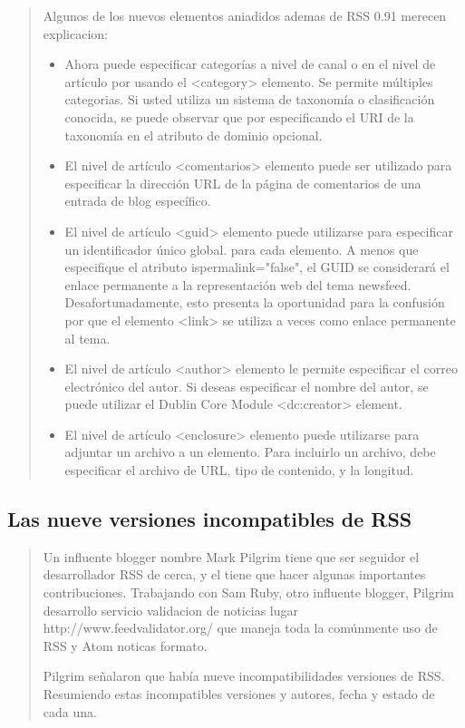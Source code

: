 \blockquote {

Algunos de los nuevos elementos aniadidos ademas de RSS 0.91 merecen explicacion:

\begin{itemize}

\item Ahora puede especificar categorías a nivel de canal o en el nivel de artículo por usando el <category>
 elemento. Se permite múltiples categorias. Si usted utiliza un sistema de taxonomía o clasificación 
 conocida, se puede observar que por especificando el URI de la taxonomía en el atributo de dominio opcional.

\item El nivel de artículo <comentarios> elemento puede ser utilizado para especificar la dirección URL de la
página de comentarios de una entrada de blog específico.

\item El nivel de artículo <guid> elemento puede utilizarse para especificar un identificador único global.
para cada elemento. A menos que especifique el atributo ispermalink="false", el GUID se considerará el 
enlace permanente a la representación web del tema newsfeed. Desafortunadamente, esto presenta la oportunidad
para la confusión por que el elemento <link> se utiliza a veces como enlace permanente al tema.

\item El nivel de artículo <author> elemento le permite especificar el correo electrónico del autor. Si deseas
especificar el nombre del autor, se puede utilizar el Dublin Core Module <dc:creator> element.

\item El nivel de artículo <enclosure> elemento puede utilizarse para adjuntar un archivo a un elemento. Para incluirlo
un archivo, debe especificar el archivo de URL, tipo de contenido, y la longitud.\cite{johnson2006rss}

\end{itemize}

}

\normalsize

\subsection{Las nueve versiones incompatibles de RSS}

\scriptsize

\blockquote{

Un influente blogger nombre Mark Pilgrim tiene que ser seguidor el desarrollador RSS de cerca, y el tiene que hacer
algunas importantes contribuciones. Trabajando con Sam Ruby, otro influente blogger, Pilgrim desarrollo servicio validacion de noticias lugar http://www.feedvalidator.org/ que maneja toda la comúnmente uso de RSS y Atom noticas
formato. 

Pilgrim señalaron que había nueve incompatibilidades versiones de RSS. Resumiendo estas incompatibles versiones y
autores, fecha y estado de cada una.

}

